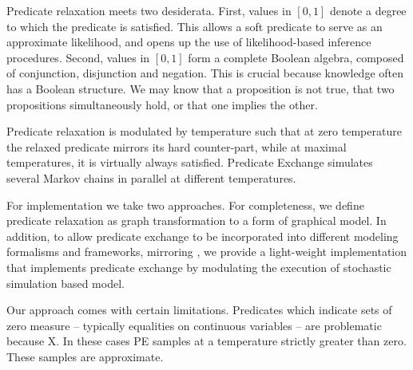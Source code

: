Predicate relaxation meets two desiderata.
First, values in $[0, 1]$ denote a degree to which the predicate is satisfied.
This allows a soft predicate to serve as an approximate likelihood, and opens up the use of likelihood-based inference procedures.
Second, values in $[0, 1]$ form a complete Boolean algebra, composed of conjunction, disjunction and negation.
This is crucial because knowledge often has a Boolean structure.
We may know that a proposition is not true, that two propositions simultaneously hold, or that one implies the other.

Predicate relaxation is modulated by temperature such that at zero temperature the relaxed predicate mirrors its hard counter-part, while at maximal temperatures, it is virtually always satisfied.
Predicate Exchange simulates several Markov chains in parallel at different temperatures.

For implementation we take two approaches.
For completeness, we define predicate relaxation as graph transformation to a form of graphical model. 
In addition, to allow predicate exchange to be incorporated into different modeling formalisms and frameworks, mirroring  \cite{wingate2011lightweight}, we provide a light-weight implementation that implements predicate exchange by modulating the execution of stochastic simulation based model. 

Our approach comes with certain limitations.
Predicates which indicate sets of zero measure -- typically equalities on continuous variables -- are problematic because X.
In these cases PE samples at a temperature strictly greater than zero.
These samples are approximate.


